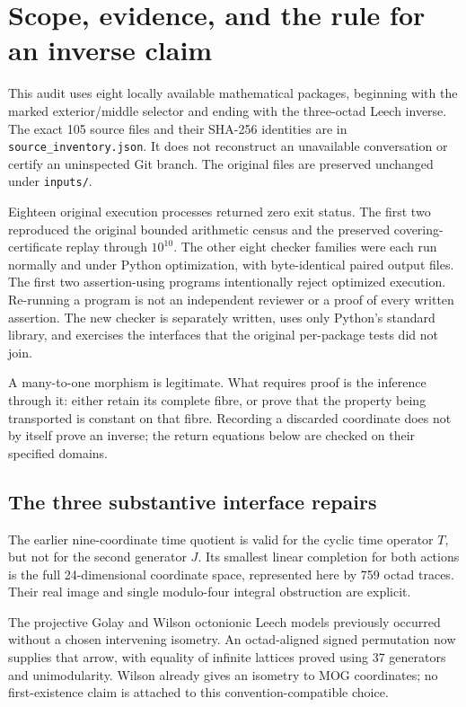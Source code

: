 \section{Scope, evidence, and the rule for an inverse claim}
This audit uses eight locally available mathematical packages, beginning with the marked exterior/middle selector and ending with the three-octad Leech inverse. The exact 105 source files and their SHA-256 identities are in \texttt{source\_inventory.json}. It does not reconstruct an unavailable conversation or certify an uninspected Git branch. The original files are preserved unchanged under \texttt{inputs/}.

Eighteen original execution processes returned zero exit status. The first two reproduced the original bounded arithmetic census and the preserved covering-certificate replay through $10^{10}$. The other eight checker families were each run normally and under Python optimization, with byte-identical paired output files. The first two assertion-using programs intentionally reject optimized execution. Re-running a program is not an independent reviewer or a proof of every written assertion. The new checker is separately written, uses only Python's standard library, and exercises the interfaces that the original per-package tests did not join.

A many-to-one morphism is legitimate. What requires proof is the inference through it: either retain its complete fibre, or prove that the property being transported is constant on that fibre. Recording a discarded coordinate does not by itself prove an inverse; the return equations below are checked on their specified domains.

\subsection{The three substantive interface repairs}
The earlier nine-coordinate time quotient is valid for the cyclic time operator $T$, but not for the second generator $J$. Its smallest linear completion for both actions is the full 24-dimensional coordinate space, represented here by 759 octad traces. Their real image and single modulo-four integral obstruction are explicit.

The projective Golay and Wilson octonionic Leech models previously occurred without a chosen intervening isometry. An octad-aligned signed permutation now supplies that arrow, with equality of infinite lattices proved using 37 generators and unimodularity. Wilson already gives an isometry to MOG coordinates; no first-existence claim is attached to this convention-compatible choice.

